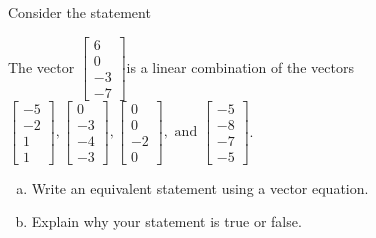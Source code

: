 
\begin{exerciseStatement}


Consider the statement 
\begin{center}\begin{minipage}{0.8\textwidth}
 The vector \( \left[\begin{array}{c}
6 \\
0 \\
-3 \\
-7
\end{array}\right] \)is a linear combination of the vectors \( \left[\begin{array}{c}
-5 \\
-2 \\
1 \\
1
\end{array}\right] , \left[\begin{array}{c}
0 \\
-3 \\
-4 \\
-3
\end{array}\right] , \left[\begin{array}{c}
0 \\
0 \\
-2 \\
0
\end{array}\right] , \text{ and } \left[\begin{array}{c}
-5 \\
-8 \\
-7 \\
-5
\end{array}\right] \). 
\end{minipage}\end{center}
    


\begin{enumerate}[(a)]
\item  Write an equivalent statement using a vector equation.
\item  Explain why your statement is true or false.
\end{enumerate}
    
\end{exerciseStatement}
    
